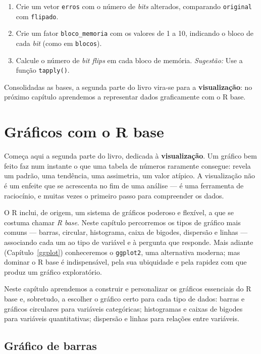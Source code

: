 \documentclass[
  portuguese,
  11pt,
  openany]{book}
\begin{document}
\begin{enumerate}
\def\labelenumi{(\alph{enumi})}
\item
  Crie um vetor \texttt{erros} com o número de \emph{bits} alterados, comparando \texttt{original} com
  \texttt{flipado}.
\item
  Crie um fator \texttt{bloco\_memoria} com os valores de 1 a 10, indicando o bloco de cada
  \emph{bit} (como em \texttt{blocos}).
\item
  Calcule o número de \emph{bit flips} em cada bloco de memória.
  \emph{Sugestão:} Use a função \texttt{tapply()}.
\end{enumerate}

Consolidadas as bases, a segunda parte do livro vira-se para a \textbf{visualização}: no
próximo capítulo aprendemos a representar dados graficamente com o R base.

\chapter{Gráficos com o R base}\label{graficos}

Começa aqui a segunda parte do livro, dedicada à \textbf{visualização}. Um gráfico bem
feito faz num instante o que uma tabela de números raramente consegue: revela um
padrão, uma tendência, uma assimetria, um valor atípico. A visualização não é um
enfeite que se acrescenta no fim de uma análise --- é uma ferramenta de raciocínio, e
muitas vezes o primeiro passo para compreender os dados.

O R inclui, de origem, um sistema de gráficos poderoso e flexível, a que se costuma
chamar \emph{R base}. Neste capítulo percorremos os tipos de gráfico mais comuns ---
barras, circular, histograma, caixa de bigodes, dispersão e linhas --- associando cada
um ao tipo de variável e à pergunta que responde. Mais adiante (Capítulo~\ref{ggplot}) conheceremos o \texttt{ggplot2}, uma alternativa moderna; mas dominar o R
base é indispensável, pela sua ubiquidade e pela rapidez com que produz um gráfico
exploratório.

Neste capítulo aprendemos a construir e personalizar os gráficos essenciais do R base
e, sobretudo, a escolher o gráfico certo para cada tipo de dados: barras e gráficos
circulares para variáveis categóricas; histogramas e caixas de bigodes para variáveis
quantitativas; dispersão e linhas para relações entre variáveis.

\section{Gráfico de barras}\label{gruxe1fico-de-barras}
\end{document}
